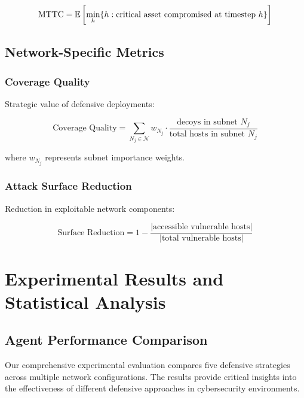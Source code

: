 \documentclass[12pt,twoside]{article}
\theoremstyle{definition}
\theoremstyle{plain}
\begin{document}
\begin{equation}
\text{MTTC} = \mathbb{E}\left[\min_h \{h : \text{critical asset compromised at timestep } h\}\right]
\end{equation}

\subsection{Network-Specific Metrics}

\subsubsection{Coverage Quality}
Strategic value of defensive deployments:

\begin{equation}
\text{Coverage Quality} = \sum_{N_j \in \mathcal{N}} w_{N_j} \cdot \frac{\text{decoys in subnet } N_j}{\text{total hosts in subnet } N_j}
\end{equation}

where $w_{N_j}$ represents subnet importance weights.

\subsubsection{Attack Surface Reduction}
Reduction in exploitable network components:

\begin{equation}
\text{Surface Reduction} = 1 - \frac{|\text{accessible vulnerable hosts}|}{|\text{total vulnerable hosts}|}
\end{equation}

\section{Experimental Results and Statistical Analysis}

\subsection{Agent Performance Comparison}

Our comprehensive experimental evaluation compares five defensive strategies across multiple network configurations. The results provide critical insights into the effectiveness of different defensive approaches in cybersecurity environments.
\end{document}

